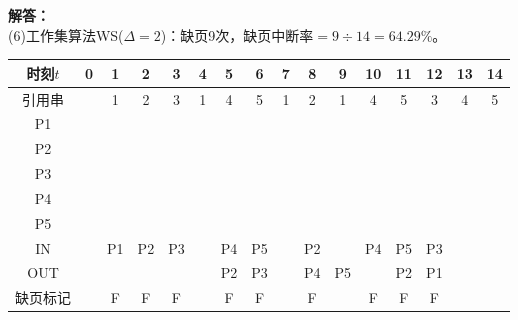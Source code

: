 \documentclass[10pt,a4paper,UTF8]{ctexart}
\newenvironment{solution}{\noindent\textbf{解答：}\\ \indent}{\par}
\begin{document}
\begin{solution}
	(6)工作集算法WS($\Delta=2$)：缺页9次，缺页中断率$=9\div 14=64.29\%$。
	\begin{table}[H]
		\vspace{-0.5em}
		\centering
		\begin{tabular}{|c|c|c|c|c|c|c|c|c|c|c|c|c|c|c|c|}
		\hline
		时刻$t$  & 0 & 1  & 2  & 3  & 4 & 5  & 6  & 7 & 8  & 9  & 10 & 11 & 12 & 13 & 14 \\ \hline
		引用串  &   & 1  & 2  & 3  & 1 & 4  & 5  & 1 & 2  & 1  & 4  & 5  & 3  & 4  & 5  \\ \hline
		P1   &   & \checkmark  & \checkmark  & \checkmark  & \checkmark & \checkmark  & \checkmark  & \checkmark & \checkmark  & \checkmark  & \checkmark  & \checkmark  &    &    &    \\ \hline
		P2   &   &    & \checkmark  & \checkmark  & \checkmark &    &    &   & \checkmark  & \checkmark  & \checkmark  &    &    &    &    \\ \hline
		P3   &   &    &    & \checkmark  & \checkmark & \checkmark  &    &   &    &    &    &    & \checkmark  & \checkmark  & \checkmark  \\ \hline
		P4   &   &    &    &    &   & \checkmark  & \checkmark  & \checkmark &    &    & \checkmark  & \checkmark  & \checkmark  & \checkmark  & \checkmark  \\ \hline
		P5   &   &    &    &    &   &    & \checkmark  & \checkmark & \checkmark  &    &    & \checkmark  & \checkmark  & \checkmark  & \checkmark  \\ \hline
		IN   &   & P1 & P2 & P3 &   & P4 & P5 &   & P2 &    & P4 & P5 & P3 &    &    \\ \hline
		OUT  &   &    &    &    &   & P2 & P3 &   & P4 & P5 &    & P2 & P1 &    &    \\ \hline
		缺页标记 &   & F  & F  & F  &   & F  & F  &   & F  &    & F  & F  & F  &    &    \\ \hline
		\end{tabular}
		\vspace{-1em}
	\end{table}
\end{solution}
\end{document}
